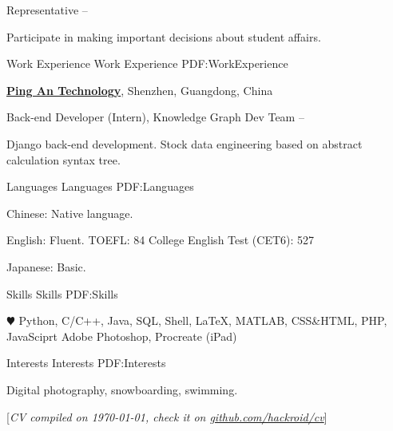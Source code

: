 \documentclass[a4paper,MMMyyyy,nonstopmode]{simpleresumecv}
\newcommand{\CVNote}{CV compiled on {\today}, check it on \href{https://github.com/hackroid/cv}{github.com/hackroid/cv}}
\begin{document}
\begin{Body}
    \Gap
    \BulletItem
    Representative
    \hfill
     --
    \begin{Detail}
        \SubBulletItem
        Participate in making important decisions about student affairs.
    \end{Detail}


    \Section
    {Work\newline
        Experience}
    {Work Experience}
    {PDF:WorkExperience}

    \Entry
    \href{https://tech.pingan.com/}
    {\textbf{Ping An Technology}},
    Shenzhen, Guangdong, China

    \Gap
    \BulletItem
    Back-end Developer (Intern),
    Knowledge Graph Dev Team
    \hfill
     --
    \begin{Detail}
        \SubBulletItem
        Django back-end development.
        \SubBulletItem
        Stock data engineering based on abstract calculation syntax tree.
    \end{Detail}



    \Section
    {Languages}
    {Languages}
    {PDF:Languages}

    \BulletItem
    Chinese: Native language.

    \Gap
    \BulletItem
    English: Fluent.
    \SubBulletItem
    [\DatestampYMD{2020}{12}{06}]
    TOEFL: 84
    \SubBulletItem
    [\DatestampYMD{2019}{06}{01}]
    College English Test  (CET6): 527

    \Gap
    \BulletItem
    Japanese: Basic.


    \Section
    {Skills}
    {Skills}
    {PDF:Skills}

    \Entry
    \BulletItem
    {\color{black} $\varheart$} Python,
    C/C++,
    Java,
    SQL,
    Shell,
    {\LaTeX},
    MATLAB,
    CSS\&HTML,
    PHP,
    JavaSciprt
    \BulletItem
    Adobe Photoshop,
    Procreate (iPad)


    \Section
    {Interests}
    {Interests}
    {PDF:Interests}

    \Entry
    Digital photography,
    snowboarding,
    swimming.



\end{Body}


\BigGap
\UseNoteFont%
\null\hfill%
[\textit{\CVNote}]
\end{document}
